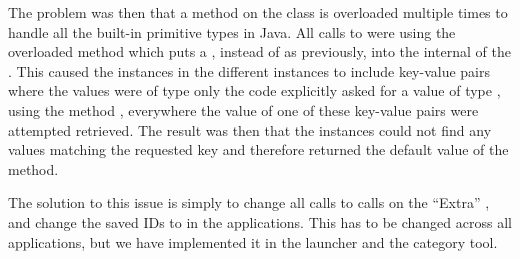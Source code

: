 The problem was then that a method  on the  class is overloaded multiple times to handle all the built-in primitive types in Java. All calls to  were using the overloaded method which puts a , instead of  as previously, into the internal  of the . This caused the  instances in the different  instances to include key-value pairs where the values were of type  only the code explicitly asked for a value of type , using the method , everywhere the value of one of these key-value pairs were attempted retrieved. The result was then that the  instances could not find any  values matching the requested key and therefore returned the default value of the  method.     

The solution to this issue is simply to change all  calls to  calls on the ``Extra'' , and change the saved IDs to  in the applications. This has to be changed across all applications, but we have implemented it in the launcher and the category tool. 